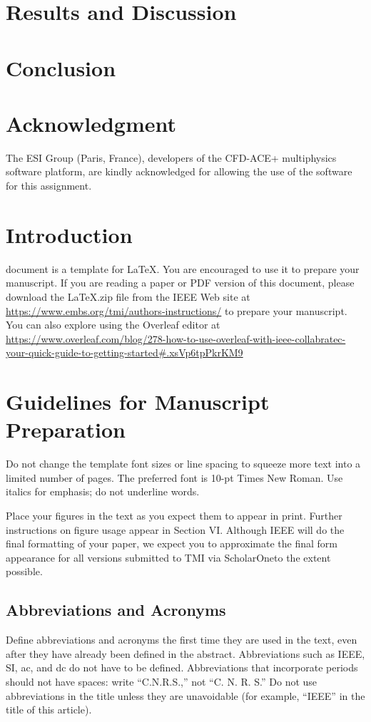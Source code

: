 \documentclass[journal,twoside,web]{ieeecolor}
\begin{document}
\section{Results and Discussion}
\section{Conclusion}
\section*{Acknowledgment}
The ESI Group (Paris, France), developers of the CFD-ACE+ multiphysics software platform, are kindly acknowledged for allowing the use of the software for this assignment.

\section{Introduction}
\label{sec:introduction}
 document is a template for \LaTeX.
You are encouraged to use it to prepare your manuscript.
If you are reading a paper or PDF version of this document, please download the
\LaTeX .zip file from the IEEE Web site at \underline
{https://www.embs.org/tmi/authors-instructions/} to prepare your manuscript.
You can also explore using the Overleaf editor at
\underline
{https://www.overleaf.com/blog/278-how-to-use-overleaf-with-}\discretionary{}{}{}\underline
{ieee-collabratec-your-quick-guide-to-getting-started\#.}\discretionary{}{}{}\underline{xsVp6tpPkrKM9}

\section{Guidelines for Manuscript Preparation}
Do not change the template font sizes or line spacing to squeeze more text into a limited number of pages.
The preferred font is 10-pt Times New Roman. Use italics for emphasis; do not underline words.

Place your figures in the text as you expect them to appear in print. Further instructions
on figure usage appear in Section VI. Although IEEE will do the final formatting of your paper,
we expect you to approximate the final form appearance for all versions
submitted to TMI via ScholarOne\textregistered to the extent possible.

\subsection{Abbreviations and Acronyms}
Define abbreviations and acronyms the first time they are used in the text,
even after they have already been defined in the abstract. Abbreviations
such as IEEE, SI, ac, and dc do not have to be defined. Abbreviations that
incorporate periods should not have spaces: write ``C.N.R.S.,'' not ``C. N.
R. S.'' Do not use abbreviations in the title unless they are unavoidable
(for example, ``IEEE'' in the title of this article).
\end{document}
